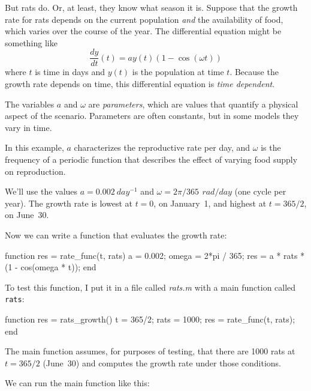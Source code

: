 \documentclass[../../book.tex]{subfiles}
\begin{document}

But rats do.  Or, at least, they know what season it is.
Suppose that the growth rate for rats depends on the current population \emph{and} the availability of food, which varies over the course of the year.
The differential equation might be something like
%
\begin{equation*}
\frac{dy}{dt}(t) = a y(t) \left(1 - \cos (\omega t) \right)
\end{equation*}
%
where $t$ is time in days and $y(t)$ is the population at time $t$.
Because the growth rate depends on time, this differential equation is \emph{time dependent}.

The variables $a$ and $\omega$ are \emph{parameters}, which are values that
quantify a physical aspect of the scenario.  Parameters are often constants, but in some models they vary in time.


In this example, $a$ characterizes the reproductive rate per day, and
$\omega$ is the frequency of a periodic function that describes
the effect of varying food supply on reproduction.

We'll use the values $a = \SI{0.002}{day^{-1}}$
and $\omega = 2 \pi / 365 \, \SI{}{rad/day}$ (one cycle per year).
The growth rate is lowest at $t=0$, on January~1, and highest at $t=365/2$, on June~30.

Now we can write a function that evaluates the growth rate:

\begin{code}
function res = rate_func(t, rats)
    a = 0.002;
    omega = 2*pi / 365;
    res = a * rats * (1 - cos(omega * t));
end
\end{code}

To test this function, I put it in a file called \emph{rats.m} with a main function called
\lstinline{rats}:

\begin{code}
function res = rats_growth()
    t = 365/2;
    rats = 1000;
    res = rate_func(t, rats);
end
\end{code}

The main function assumes, for purposes of testing, that
there are 1000 rats at $t=365/2$ (June~30) and computes the growth rate under those conditions.

We can run the main function like this:
\end{document}
